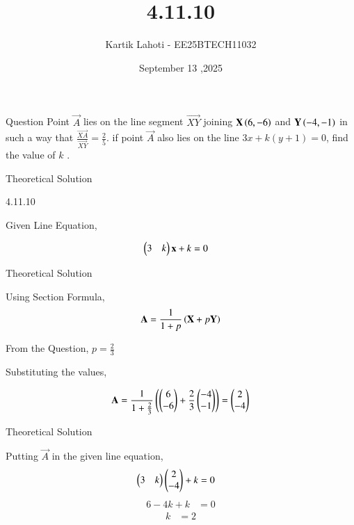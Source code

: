 \documentclass{beamer}
\title %
{4.11.10}
\date{September 13 ,2025}
\author 
{Kartik Lahoti - EE25BTECH11032}
\begin{document}
\frame{\titlepage}
\begin{frame}{Question}
Point $\vec{A}$ lies on the line segment $\vec{XY}$  joining $\mathbf{X}\left(6,-6\right)$ and $\mathbf{Y}\left(-4,-1\right)$ in such a way that $\frac{\vec{XA}}{\vec{XY}} = \frac{2}{5}$. if point $\vec{A}$ also lies on the line $3x + k(y+1) = 0$, find the value of $k$ .
\end{frame}

\begin{frame}{Theoretical Solution}

\begin{table}[H]
    \centering
    
    \caption{4.11.10}
    \label{tab:placeholder_1}
\end{table}

Given Line Equation, 

\begin{align}
        \begin{pmatrix}3 & k\end{pmatrix}\mathbf{x} + k &= 0  
\end{align}

\end{frame}
\begin{frame}{Theoretical Solution}

Using Section Formula,
\begin{align}
  \mathbf{A} = \frac{1}{1+p}\left(\mathbf{X} + p\mathbf{Y}\right)
\end{align}

From the Question, $p = \frac{2}{3}$

Substituting the values, 

\begin{align}
  \mathbf{A} =  \frac{1}{1 + \frac{2}{3}}\left(\begin{pmatrix}6 \\ -6\end{pmatrix} + \frac{2}{3}\begin{pmatrix}-4\\-1\end{pmatrix}\right) = \begin{pmatrix}2 \\ -4\end{pmatrix}
\end{align}

\end{frame}
\begin{frame}{Theoretical Solution}

Putting $\vec{A}$ in the given line equation,
\begin{align}
  \begin{pmatrix}3 & k\end{pmatrix}\begin{pmatrix}2 \\ -4 \end{pmatrix} + k &= 0 
\end{align}
\begin{align}
    6 - 4k + k &= 0 
\end{align}
\begin{align}
    k &= 2
\end{align}
\end{frame}
\end{document}

